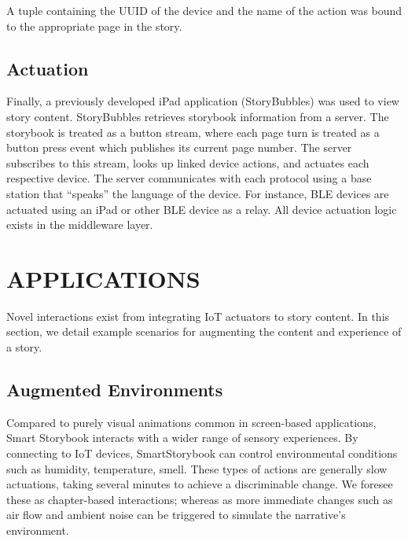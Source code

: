 \documentclass{sigchi}
\newcommand\namesp{SmartStorybook }
\begin{document}
A tuple containing the UUID of the device and the name of the action was bound to the appropriate page in the story.

\subsection{Actuation}
Finally, a previously developed iPad application (StoryBubbles) was used to view story content. StoryBubbles retrieves storybook information from a server. The storybook is treated as a button stream, where each page turn is treated as a button press event which publishes its current page number. The server subscribes to this stream, looks up linked device actions, and actuates each respective device. 
The server communicates with each protocol using a base station that ``speaks'' the language of the device. For instance, BLE devices are actuated using an iPad or other BLE device as a relay. All device actuation logic exists in the middleware layer. 



\section{APPLICATIONS}
Novel interactions exist from integrating IoT actuators to story content. In this section, we detail example scenarios for augmenting the content and experience of a story. 

\subsection{Augmented Environments}
Compared to purely visual animations common in screen-based applications, Smart Storybook interacts with a wider range of sensory experiences. By connecting to IoT devices, \namesp can control environmental conditions such as humidity, temperature, smell. These types of actions are generally slow actuations, taking several minutes to achieve a discriminable change. We foresee these as chapter-based interactions; whereas as more immediate changes such as air flow and ambient noise can be triggered to simulate the narrative's environment.
\end{document}
